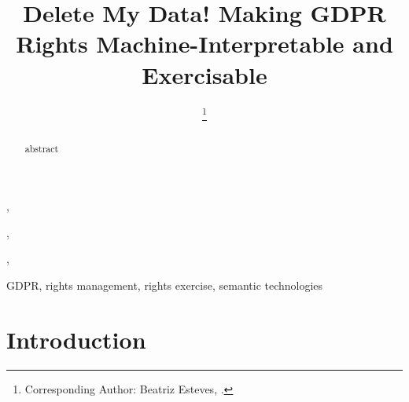 \documentclass{IOS-Book-Article}     %
\begin{document}
\begin{frontmatter}          %
%
\title{Delete My Data! Making GDPR Rights Machine-Interpretable and Exercisable}

\author[A]{ 
\thanks{Corresponding Author: Beatriz Esteves, .}},
\author[B]{ },
\author[C]{ },
\author[D]{ }
\address[A]{IDLab, Ghent University -- imec, Ghent, Belgium}
\address[B]{ADAPT Centre, Dublin City University, Dublin, Ireland}
\address[C]{Signatu AS, Oslo, Norway}
\address[D]{ADAPT Centre, Dublin City University, and Uniphar PLC, Dublin, Ireland}

\begin{abstract}
abstract
\end{abstract}

\begin{keyword}
GDPR, rights management, rights exercise, semantic technologies
\end{keyword}

\end{frontmatter}

\section{Introduction}
\label{sec:intro}
\end{document}
